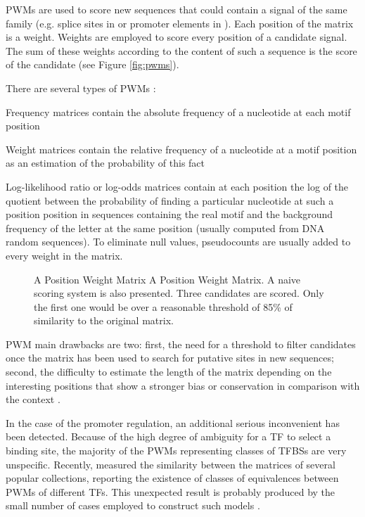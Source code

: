 PWMs are used to score new sequences that could contain a signal of the same family 
(e.g. splice sites in \citet{guigo:1992a} or promoter elements in \citet{bucher:1990a}).
Each position of the matrix is a weight. Weights are employed to score every position of 
a candidate signal. The sum of these weights according to the content of such a sequence is
the score of the candidate (see Figure \ref{fig:pwms}). 

There are several types of PWMs \citep{wasserman:2004a}:

\begin{mitemize}
\item
Frequency matrices contain the absolute frequency of a nucleotide at each motif position
\item
Weight matrices contain the relative frequency of a nucleotide at a motif position as an 
estimation of the probability of this fact
\item
Log-likelihood ratio or log-odds matrices 
 contain at each position the log of the quotient 
between the probability of finding a particular nucleotide at such a position
position in sequences containing the real motif and the background frequency
of the letter at the same position (usually computed from DNA random sequences).
To eliminate null values, pseudocounts are usually added to every weight in the matrix. 
\end{mitemize}

\begin{figure}[t!]
\begin{center}
\setlength{\fboxsep}{0pt}
          {A Position Weight Matrix}%
          {A Position Weight Matrix.}%
          {A naive scoring system is also presented. Three candidates are scored. Only the first one
would be over a reasonable threshold of 85\% of similarity to the original matrix.}
\end{center}
\end{figure}

PWM main drawbacks are two: first, the need for a threshold to filter candidates
once the matrix has been used to search for putative sites in new sequences; second, 
the difficulty to estimate the length of the matrix depending on the interesting positions
that show a stronger bias or conservation in comparison with the context \citep{stormo:2000b}.

In the case of the promoter regulation, an additional serious inconvenient has been detected. Because
of the high degree of ambiguity for a TF to select a binding site, the majority of the PWMs representing
classes of TFBSs are very unspecific. Recently, \citet{schones:2005a} measured the similarity
between the matrices of several popular collections, reporting the existence of classes of equivalences
between PWMs of different TFs. This unexpected result is probably produced by the small number of
cases employed to construct such models \citep{rahmann:2003a}.

